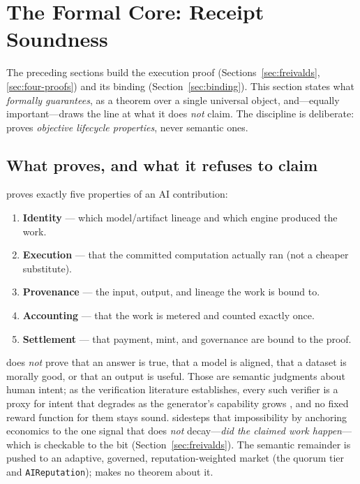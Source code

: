 \section{The Formal Core: Receipt Soundness}
\label{sec:receipt-soundness}

The preceding sections build the execution proof (Sections~\ref{sec:freivalds},
\ref{sec:four-proofs}) and its binding (Section~\ref{sec:binding}). This
section states what \PoAI{} \emph{formally guarantees}, as a theorem over a single
universal object, and---equally important---draws the line at what it does
\emph{not} claim. The discipline is deliberate: \PoAI{} proves \emph{objective
lifecycle properties}, never semantic ones.

\subsection{What \PoAI{} proves, and what it refuses to claim}
\label{sec:rs-scope}

\PoAI{} proves exactly five properties of an AI contribution:

\begin{enumerate}[leftmargin=2em,itemsep=1pt]
  \item \textbf{Identity} --- which model/artifact lineage and which engine produced the work.
  \item \textbf{Execution} --- that the committed computation actually ran (not a cheaper substitute).
  \item \textbf{Provenance} --- the input, output, and lineage the work is bound to.
  \item \textbf{Accounting} --- that the work is metered and counted exactly once.
  \item \textbf{Settlement} --- that payment, mint, and governance are bound to the proof.
\end{enumerate}

\PoAI{} does \emph{not} prove that an answer is true, that a model is aligned, that
a dataset is morally good, or that an output is useful. Those are semantic judgments
about human intent; as the verification literature establishes, every such verifier
is a proxy for intent that degrades as the generator's capability grows
\cite{verificationhorizon}, and no fixed reward function for them stays sound.
\PoAI{} sidesteps that impossibility by anchoring economics to the one signal that
does \emph{not} decay---\emph{did the claimed work happen}---which is checkable to the
bit (Section~\ref{sec:freivalds}). The semantic remainder is pushed to an
adaptive, governed, reputation-weighted market (the quorum tier and
\texttt{AIReputation}); \PoAI{} makes no theorem about it.

